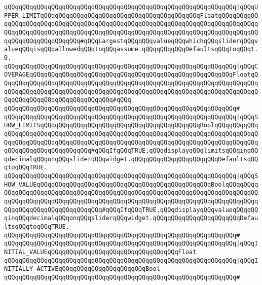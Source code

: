 \verb|qQQqqQQqqQQqqQQqqQQqqQQqqQQqqQQqqQQqqQQqqQQqqQQqqQQqqQQqqQQqqQQq|\verb#|qQQqUPPER_LIMITqQQqqQQqqQQqqQQqqQQqqQQqqQQqqQQqqQQqqQQqqQQqFloatqQQqqQQqqQQqqQQqqQQqqQQqqQQqqQQqqQQqqQQqqQQqqQQqqQQqqQQqqQQqqQQqqQQqqQQqqQQqqQQqqQQqqQQqqQQqqQQqqQQqqQQqqQQqqQQqqQQqqQQqqQQqqQQqqQQqqQQqqQQqqQQqqQQqqQQqqQQqqQQqqQQqqQQqqQQq#\verb|#qQQqLargestqQQqqQQqvalueqQQqwhichqQQqsliderqQQqvalueqQQqisqQQqallowedqQQqtoqQQqassume.qQQqqQQqqQQqDefaultsqQQqtoqQQq1.0.|\newline
\verb|qQQqqQQqqQQqqQQqqQQqqQQqqQQqqQQqqQQqqQQqqQQqqQQqqQQqqQQqqQQqqQQq|\verb#|qQQqCOVERAGEqQQqqQQqqQQqqQQqqQQqqQQqqQQqqQQqqQQqqQQqqQQqqQQqqQQqqQQqFloatqQQqqQQqqQQqqQQqqQQqqQQqqQQqqQQqqQQqqQQqqQQqqQQqqQQqqQQqqQQqqQQqqQQqqQQqqQQqqQQqqQQqqQQqqQQqqQQqqQQqqQQqqQQqqQQqqQQqqQQqqQQqqQQqqQQqqQQqqQQqqQQqqQQqqQQqqQQqqQQqqQQqqQQqqQQq#\verb|#qQQq|\newline
\verb|qQQqqQQqqQQqqQQqqQQqqQQqqQQqqQQqqQQqqQQqqQQqqQQqqQQqqQQqqQQqqQQq#|\newline
\verb|qQQqqQQqqQQqqQQqqQQqqQQqqQQqqQQqqQQqqQQqqQQqqQQqqQQqqQQqqQQqqQQq|\verb#|qQQqSHOW_LIMITSqQQqqQQqqQQqqQQqqQQqqQQqqQQqqQQqqQQqqQQqqQQqBoolqQQqqQQqqQQqqQQqqQQqqQQqqQQqqQQqqQQqqQQqqQQqqQQqqQQqqQQqqQQqqQQqqQQqqQQqqQQqqQQqqQQqqQQqqQQqqQQqqQQqqQQqqQQqqQQqqQQqqQQqqQQqqQQqqQQqqQQqqQQqqQQqqQQqqQQqqQQqqQQqqQQqqQQqqQQqqQQq#\verb|#qQQqIfqQQqTRUE,qQQqdisplayqQQqlimitsqQQqinqQQqdecimalqQQqonqQQqsliderqQQqwidget.qQQqqQQqqQQqqQQqqQQqqQQqDefaultsqQQqtoqQQqTRUE.|\newline
\verb|qQQqqQQqqQQqqQQqqQQqqQQqqQQqqQQqqQQqqQQqqQQqqQQqqQQqqQQqqQQqqQQq|\verb#|qQQqSHOW_VALUEqQQqqQQqqQQqqQQqqQQqqQQqqQQqqQQqqQQqqQQqqQQqqQQqBoolqQQqqQQqqQQqqQQqqQQqqQQqqQQqqQQqqQQqqQQqqQQqqQQqqQQqqQQqqQQqqQQqqQQqqQQqqQQqqQQqqQQqqQQqqQQqqQQqqQQqqQQqqQQqqQQqqQQqqQQqqQQqqQQqqQQqqQQqqQQqqQQqqQQqqQQqqQQqqQQqqQQqqQQqqQQqqQQq#\verb|#qQQqIfqQQqTRUE,qQQqdisplayqQQqvalueqQQqqQQqinqQQqdecimalqQQqonqQQqsliderqQQqwidget.qQQqqQQqqQQqqQQqqQQqqQQqDefaultsqQQqtoqQQqTRUE.|\newline
\verb|qQQqqQQqqQQqqQQqqQQqqQQqqQQqqQQqqQQqqQQqqQQqqQQqqQQqqQQqqQQqqQQq#|\newline
\verb|qQQqqQQqqQQqqQQqqQQqqQQqqQQqqQQqqQQqqQQqqQQqqQQqqQQqqQQqqQQqqQQq|\verb#|qQQqINITIAL_VALUEqQQqqQQqqQQqqQQqqQQqqQQqqQQqqQQqqQQqFloat#\newline
\verb|qQQqqQQqqQQqqQQqqQQqqQQqqQQqqQQqqQQqqQQqqQQqqQQqqQQqqQQqqQQqqQQq|\verb#|qQQqINITIALLY_ACTIVEqQQqqQQqqQQqqQQqqQQqqQQqBool#\newline
\verb|qQQqqQQqqQQqqQQqqQQqqQQqqQQqqQQqqQQqqQQqqQQqqQQqqQQqqQQqqQQqqQQq#|\newline
